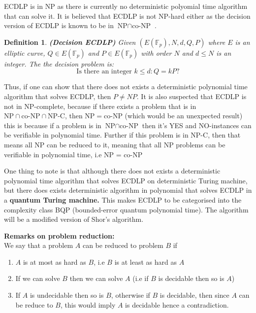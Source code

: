 \documentclass[a4 paper]{article}
\newcommand{\?}{\stackrel{?}{=}}
\newtheorem{definition}{Definition}[section]
\begin{document}
\begin{note}{\bcicosaedre}
ECDLP is in NP as there is currently no deterministic polyomial time algorithm that can solve it. It is believed that ECDLP is not NP-hard either as the decision version of ECDLP is known to be in $ \text{NP} \cap \text{co-NP} $ . 
\begin{Definition}
\begin{definition}
\textbf{(Decision ECDLP)} Given $ (E(\mathbb{F}_p), N , d , Q , P) $ where $ E $ is an elliptic curve, $ Q \in E(\mathbb{F}_p) $ and $ P \in E(\mathbb{F}_p) $ with order $ N $ and $ d \leq N $ is an integer. The the decision problem is: 
$$ \text{Is there an integer } k\leq d : Q = k P \text{?} $$
\end{definition}
\end{Definition}
Thus, if one can show that there does not exists a deterministic polynomial time algorithm that solves ECDLP, then $ P \neq NP $\cite[\S 4.1]{hankerson2006guide}. It is also suspected that ECDLP is not in NP-complete, because if there exists a problem that is in $ \text{NP}\cap \text{co-NP} \cap \text{NP-C}  $, then NP$ = $co-NP (which would be an unexpected result) this is because if a problem is in $ \text{NP}\cap \text{co-NP}  $ then it's YES and NO-instances can be verifiable in polynomial time. Further if this problem is in NP-C, then that means all NP can be reduced to it, meaning that all NP problems can be verifiable in polynomial time, i.e NP = co-NP \\ 
\vspace{1em}

One thing to note is that although there does not exists a deterministic polynomial time algorithm that solves ECDLP on deterministic Turing machine, but there does exists deterministic algorithm in polynomial that solves ECDLP in a \textbf{quantum Turing machine.} This makes ECDLP to be categorised into the complexity class BQP (bounded-error quantum polynomial time). The algorithm will be a modified version of Shor's algorithm. \cite[]{enwiki:1158928892}

\end{note}

\begin{note}{\bcicosaedre}
\textbf{Remarks on problem reduction:}  \\ 
We say that a problem $ A $ can be reduced to problem $ B $ if 
\begin{enumerate}
    \item $ A $ is at most as hard as $ B $, i.e $ B $ is at least as hard as $ A $ 
    \item If we can solve $ B $ then we can solve $ A $ (i.e if $ B $ is decidable then so is $ A $)
    \item If $ A $ is undecidable then so is $ B $, otherwise if $ B $ is decidable, then since $ A  $ can be reduce to $ B $, this would imply $ A $ is decidable hence a contradiction. 
\end{enumerate}

\end{note}


 

\end{document}
